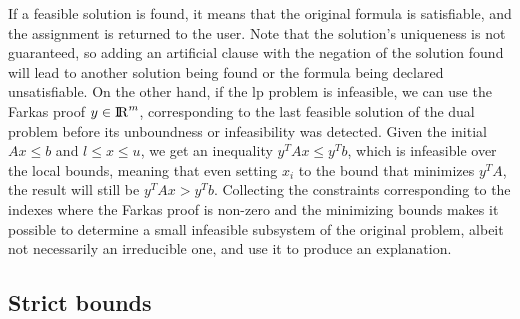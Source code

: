 \documentclass[runningheads]{llncs}
\begin{document}
If a feasible solution is found, it means that the original formula is satisfiable, and the assignment is returned to the user.
Note that the solution's uniqueness is not guaranteed, so adding an artificial clause with the negation of the solution found will lead to another solution being found or the formula being declared unsatisfiable.
On the other hand, if the \gls{lp} problem is infeasible, we can use the Farkas proof $y \in {\rm I\!R}^m$, corresponding to the last feasible solution of the dual problem before its unboundness or infeasibility was detected.
Given the initial $Ax \le b$ and $l \le x \le u$, we get an inequality $y^T A x \le y^T b$, which is infeasible over the local bounds, meaning that even setting $x_i$ to the bound that minimizes $y^T A$, the result will still be $y^T A x > y^T b$.
Collecting the constraints corresponding to the indexes where the Farkas proof is non-zero and the minimizing bounds makes it possible to determine a small infeasible subsystem of the original problem, albeit not necessarily an irreducible one, and use it to produce an explanation.

\subsection{Strict bounds}
\label{sec:strict-bounds}
\end{document}
